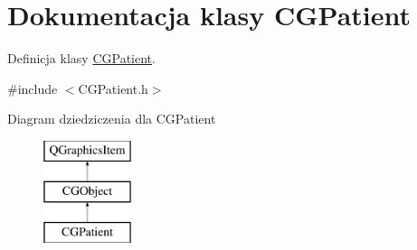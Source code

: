 \hypertarget{class_c_g_patient}{}\section{Dokumentacja klasy C\+G\+Patient}
\label{class_c_g_patient}


Definicja klasy \mbox{\hyperlink{class_c_g_patient}{C\+G\+Patient}}.  




{\ttfamily \#include $<$C\+G\+Patient.\+h$>$}

Diagram dziedziczenia dla C\+G\+Patient\begin{figure}[H]
\begin{center}
\leavevmode
\includegraphics[height=3.000000cm]{class_c_g_patient}
\end{center}
\end{figure}
